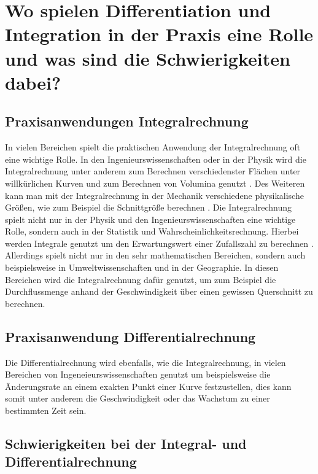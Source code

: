 \chapter{Wo spielen Differentiation und Integration in der Praxis eine Rolle und was sind die Schwierigkeiten dabei?}

\section{Praxisanwendungen Integralrechnung}

In vielen Bereichen spielt die praktischen Anwendung der Integralrechnung oft eine wichtige Rolle. In den Ingenieurswissenschaften oder in der Physik wird die Integralrechnung unter anderem zum Berechnen verschiedenster Flächen unter willkürlichen Kurven und zum Berechnen von Volumina genutzt \textsc{\cite{ARD-Alpha-Integral}} \textsc{\cite{Anwendung-Integrale}}. Des Weiteren kann man mit der Integralrechnung in der Mechanik verschiedene physikalische Größen, wie zum Beispiel die Schnittgröße berechnen \textsc{\cite{TM-Schnittgroessen}}. Die Integralrechnung spielt nicht nur in der Physik und den Ingenieurswissenschaften eine wichtige Rolle, sondern auch in der Statistik und Wahrscheinlichkeitsrechnung. Hierbei werden Integrale genutzt um den Erwartungswert einer Zufallszahl zu berechnen \textsc{\cite{MatheIngVertiefung_S.520f}}. Allerdings spielt nicht nur in den sehr mathematischen Bereichen, sondern auch beispielsweise in Umweltwissenschaften und in der Geographie. In diesen Bereichen wird die Integralrechnung dafür genutzt, um zum Beispiel die Durchflussmenge anhand der Geschwindigkeit über einen gewissen Querschnitt zu berechnen. \textsc{\cite[S. 22]{Hydrologie_S.22}}

\section{Praxisanwendung Differentialrechnung}

Die Differentialrechnung wird ebenfalls, wie die Integralrechnung, in vielen Bereichen von Ingeneieurswissenschaften genutzt um beispielsweise die Änderungsrate an einem exakten Punkt einer Kurve festzustellen, dies kann somit unter anderem die Geschwindigkeit oder das Wachstum zu einer bestimmten Zeit sein. \textsc{\cite{ElektroAbleitung}}

\section{Schwierigkeiten bei der Integral- und Differentialrechnung}


